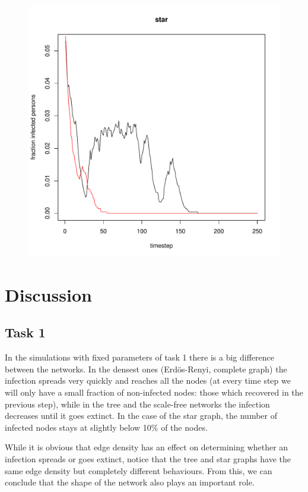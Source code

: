 \documentclass[paper=a4, fontsize=11pt]{scrartcl} %
\begin{document}
\begin{figure}[htbp] %
   \centering
   \includegraphics[width=\textwidth]{thresholdSimulation_star} 
   \label{star}
\end{figure}

\section{Discussion}
\subsection{Task 1}
In the simulations with fixed parameters of task 1 there is a big difference between the networks. In the densest ones (Erdös-Renyi, complete graph) the infection spreads very quickly and reaches all the nodes (at every time step we will only have a small fraction of non-infected nodes: those which recovered in the previous step), while in the tree and the scale-free networks the infection decreases until it goes extinct. In the case of the star graph, the number of infected nodes stays at slightly below 10\% of the nodes.

While it is obvious that edge density has an effect on determining whether an infection spreads or goes extinct, notice that the tree and star graphs have the same edge density but completely different behaviours. From this, we can conclude that the shape of the network also plays an important role.
\end{document}
